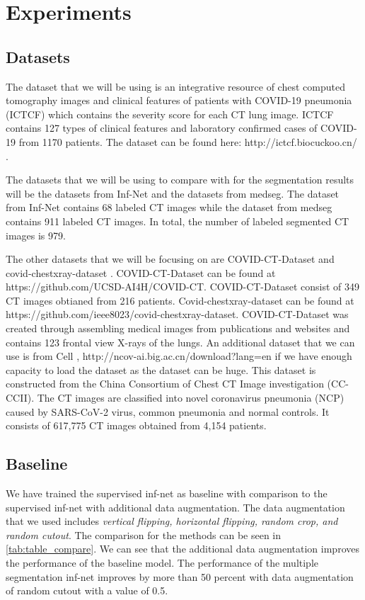 \section{Experiments}

\subsection{Datasets}
The dataset that we will be using is an integrative resource of chest computed tomography images and clinical features of patients with COVID-19 pneumonia (ICTCF) \cite{ref23} which contains the severity score for each CT lung image. ICTCF contains 127 types of clinical features and laboratory confirmed cases of COVID-19 from 1170 patients. The dataset can be found here: http://ictcf.biocuckoo.cn/ . 

The datasets that we will be using to compare with for the segmentation results will be the datasets from Inf-Net\cite{ref14} and the datasets from medseg\cite{ref26}. The dataset from Inf-Net\cite{ref14} contains 68 labeled CT images while the dataset from medseg contains 911 labeled CT images. In total, the number of labeled segmented CT images is 979.

The other datasets that we will be focusing on are COVID-CT-Dataset \cite{ref21} and covid-chestxray-dataset \cite{ref22}. COVID-CT-Dataset can be found at https://github.com/UCSD-AI4H/COVID-CT. COVID-CT-Dataset consist of 349 CT images obtianed from 216 patients. Covid-chestxray-dataset can be found at https://github.com/ieee8023/covid-chestxray-dataset. COVID-CT-Dataset  was created through assembling medical images from publications and websites and contains 123 frontal view X-rays of the lungs. An additional dataset that we can use is from Cell \cite{ref24}, http://ncov-ai.big.ac.cn/download?lang=en if we have enough capacity to load the dataset as the dataset can be huge. This dataset is constructed from the China Consortium of Chest CT Image investigation (CC-CCII). The CT images are classified into novel coronavirus pneumonia (NCP) caused by SARS-CoV-2 virus, common pneumonia and normal controls. It consists of 617,775 CT images obtained from 4,154 patients.

\subsection{Baseline}
We have trained the supervised inf-net as baseline with comparison to the supervised inf-net with additional data augmentation. The data augmentation that we used includes \textit{vertical flipping, horizontal flipping, random crop, and random cutout}. The comparison for the methods can be seen in \ref{tab:table_compare}. We can see that the additional data augmentation improves the performance of the baseline model. The performance of the multiple segmentation inf-net improves by more than 50 percent with data augmentation of random cutout with a value of 0.5.


